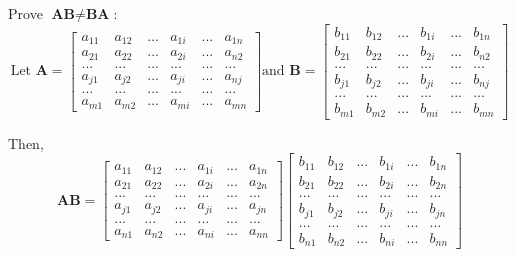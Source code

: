 \documentclass{article}
\begin{document}
\begin{enumerate}
Prove $\textbf{AB} \neq \textbf{BA} $:
		$$	\text{Let } 
		\textbf{A} = \begin{bmatrix}
		a_{11}  & a_{12} & ... & a_{1i} & ... & a_{1n} \\
		a_{21}  & a_{22} & ... & a_{2i} & ... & a_{n2} \\
		...    &  ...   & ... &  ...   & ... & ...    \\
		a_{j1}  & a_{j2} & ... & a_{ji} & ... & a_{nj} \\
		...    &  ...   & ... &  ...   & ... & ...    \\
		a_{m1}  & a_{m2} & ... & a_{mi} & ... & a_{mn} 
		\end{bmatrix}  
		\text{and }
		\textbf{B} = \begin{bmatrix}
		b_{11}  & b_{12} & ... & b_{1i} & ... & b_{1n} \\
		b_{21}  & b_{22} & ... & b_{2i} & ... & b_{n2} \\
		...    &  ...   & ... &  ...   & ... & ...    \\
		b_{j1}  & b_{j2} & ... & b_{ji} & ... & b_{nj} \\
		...    &  ...   & ... &  ...   & ... & ...    \\
		b_{m1}  & b_{m2} & ... & b_{mi} & ... & b_{mn} 
		\end{bmatrix}$$
		
		Then, 
		$$\textbf{AB} = \begin{bmatrix}
		a_{11}  & a_{12} & ... & a_{1i} & ... & a_{1n} \\
		a_{21}  & a_{22} & ... & a_{2i} & ... & a_{2n} \\
		...    &  ...   & ... &  ...   & ... & ...    \\
		a_{j1}  & a_{j2} & ... & a_{ji} & ... & a_{jn} \\
		...    &  ...   & ... &  ...   & ... & ...    \\
		a_{n1}  & a_{n2} & ... & a_{ni} & ... & a_{nn} 
		\end{bmatrix} \begin{bmatrix}
		b_{11}  & b_{12} & ... & b_{1i} & ... & b_{1n} \\
		b_{21}  & b_{22} & ... & b_{2i} & ... & b_{2n} \\
		...    &  ...   & ... &  ...   & ... & ...    \\
		b_{j1}  & b_{j2} & ... & b_{ji} & ... & b_{jn} \\
		...    &  ...   & ... &  ...   & ... & ...    \\
		b_{n1}  & b_{n2} & ... & b_{ni} & ... & b_{nn}
		\end{bmatrix} $$


\end{enumerate}
\end{document}
